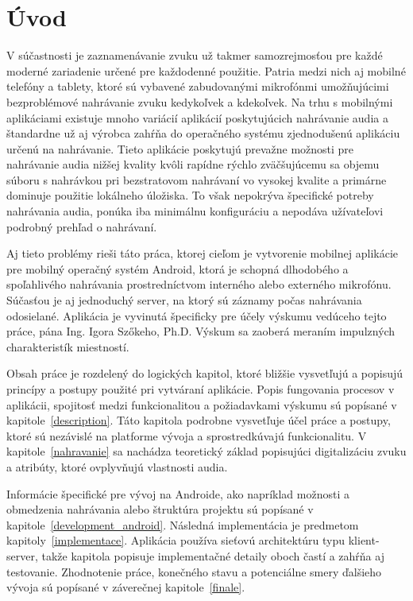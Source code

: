 
\chapter{Úvod}

V súčastnosti je zaznamenávanie zvuku už takmer samozrejmosťou pre každé moderné zariadenie určené pre každodenné použitie. Patria medzi nich aj mobilné telefóny a tablety, ktoré sú vybavené zabudovanými mikrofónmi umožňujúcimi bezproblémové nahrávanie zvuku kedykoľvek a kdekoľvek. Na trhu s mobilnými aplikáciami existuje mnoho variácií aplikácií poskytujúcich nahrávanie audia a štandardne už aj výrobca zahŕňa do operačného systému zjednodušenú aplikáciu určenú na nahrávanie. Tieto aplikácie poskytujú prevažne možnosti pre nahrávanie audia nižšej kvality kvôli rapídne rýchlo zväčšujúcemu sa objemu súboru s nahrávkou pri bezstratovom nahrávaní vo vysokej kvalite a primárne dominuje použitie lokálneho úložiska. To však nepokrýva špecifické potreby nahrávania audia, ponúka iba minimálnu konfiguráciu a nepodáva užívateľovi podrobný prehľad o nahrávaní.

Aj tieto problémy rieši táto práca, ktorej cieľom je vytvorenie mobilnej aplikácie pre mobilný operačný systém Android, ktorá je schopná dlhodobého a spoľahlivého nahrávania prostredníctvom interného alebo externého mikrofónu. Súčasťou je aj jednoduchý server, na ktorý sú záznamy počas nahrávania odosielané. Aplikácia je vyvinutá špecificky pre účely výskumu vedúceho tejto práce, pána Ing. Igora Szőkeho, Ph.D. Výskum sa zaoberá meraním impulzných charakteristík miestností.

Obsah práce je rozdelený do logických kapitol, ktoré bližšie vysvetľujú a popisujú princípy a postupy použité pri vytváraní aplikácie. Popis fungovania procesov v aplikácii, spojitosť medzi funkcionalitou a požiadavkami výskumu sú popísané v kapitole~\ref{description}. Táto kapitola podrobne vysvetľuje účel práce a postupy, ktoré sú nezávislé na platforme vývoja a sprostredkúvajú funkcionalitu. V kapitole~\ref{nahravanie} sa nachádza teoretický základ popisujúci digitalizáciu zvuku a atribúty, ktoré ovplyvňujú vlastnosti audia.

Informácie špecifické pre vývoj na Androide, ako napríklad možnosti a obmedzenia nahrávania alebo štruktúra projektu sú popísané v kapitole~\ref{development_android}. Následná implementácia je predmetom kapitoly~\ref{implementace}. Aplikácia používa sieťovú architektúru typu klient-server, takže kapitola popisuje implementačné detaily oboch častí a zahŕňa aj testovanie. Zhodnotenie práce, konečného stavu a potenciálne smery ďalšieho vývoja sú popísané v záverečnej kapitole~\ref{finale}.

